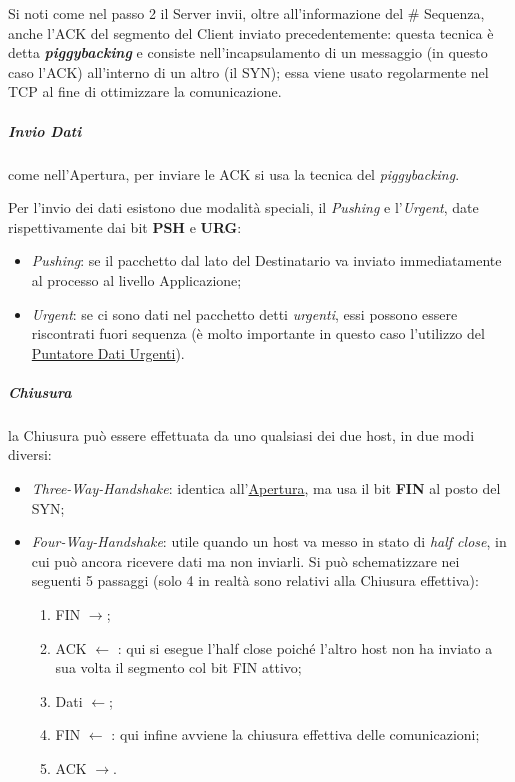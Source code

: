 \documentclass[a4paper]{article}
\begin{document}
						Si noti come nel passo 2 il Server invii, oltre all'informazione del \# Sequenza, anche l'ACK del segmento del Client inviato precedentemente: questa tecnica è detta \textbf{\emph{piggybacking}} e consiste nell'incapsulamento di un messaggio (in questo caso l'ACK) all'interno di un altro (il SYN); essa viene usato regolarmente nel TCP al fine di ottimizzare la comunicazione.
						
					\subparagraph{Invio Dati}
					\label{par:invioDati}
						come nell'Apertura, per inviare le ACK si usa la tecnica del \emph{piggybacking}.
						
						Per l'invio dei dati esistono due modalità speciali, il \emph{Pushing} e l'\emph{Urgent}, date rispettivamente dai bit \textbf{PSH} e \textbf{URG}:
						\begin{itemize}
							\item \emph{Pushing}: se il pacchetto dal lato del Destinatario va inviato immediatamente al processo al livello Applicazione;
							\item \emph{Urgent}: se ci sono dati nel pacchetto detti \emph{urgenti}, essi possono essere riscontrati fuori sequenza (è molto importante in questo caso l'utilizzo del \hyperref[par:pointerUrg]{Puntatore Dati Urgenti}).
						\end{itemize}
						
					\subparagraph{Chiusura}
						la Chiusura può essere effettuata da uno qualsiasi dei due host, in due modi diversi:
						\begin{itemize}
							\item \emph{Three-Way-Handshake}: identica all'\hyperref[par:apertura]{Apertura}, ma usa il bit \textbf{FIN} al posto del SYN;
							\item \emph{Four-Way-Handshake}: utile quando un host va messo in stato di \emph{half close}, in cui può ancora ricevere dati ma non inviarli.
							Si può schematizzare nei seguenti 5 passaggi (solo 4 in realtà sono relativi alla Chiusura effettiva):
							\begin{enumerate}
								\item FIN $ \rightarrow $;
								\item ACK $ \leftarrow $ : qui si esegue l'half close poiché l'altro host non ha inviato a sua volta il segmento col bit FIN attivo;
								\item Dati $ \leftarrow $;
								\item FIN $ \leftarrow $ : qui infine avviene la chiusura effettiva delle comunicazioni;
								\item ACK $ \rightarrow $.
							\end{enumerate}
						\end{itemize}
						
\end{document}
